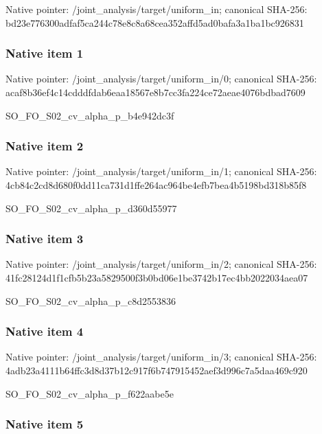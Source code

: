 \documentclass[10pt,a4paper]{article}
\begin{document}
Native pointer: /joint\_analysis/target/uniform\_in; canonical SHA-256: bd23e776300adfaf5ca244c7\allowbreak{}8e8c8a68cea352affd5ad0ba\allowbreak{}fa3a1ba1bc926831



\subsubsection{Native item 1}


Native pointer: /joint\_analysis/target/uniform\_in/0; canonical SHA-256: acaf8b36ef4c14cdddfdab6e\allowbreak{}aa18567e8b7cc3fa224ce72a\allowbreak{}eae4076bdbad7609


SO\_FO\_S02\_cv\_alpha\_p\_b4e942dc3f


\subsubsection{Native item 2}


Native pointer: /joint\_analysis/target/uniform\_in/1; canonical SHA-256: 4cb84c2cd8d680f0dd11ca73\allowbreak{}1d1ffe264ac964be4efb7bea\allowbreak{}4b5198bd318b85f8


SO\_FO\_S02\_cv\_alpha\_p\_d360d55977


\subsubsection{Native item 3}


Native pointer: /joint\_analysis/target/uniform\_in/2; canonical SHA-256: 41fc28124d1f1cfb5b23a582\allowbreak{}9500f3b0bd06e1be3742b17e\allowbreak{}c4bb2022034aea07


SO\_FO\_S02\_cv\_alpha\_p\_c8d2553836


\subsubsection{Native item 4}


Native pointer: /joint\_analysis/target/uniform\_in/3; canonical SHA-256: 4adb23a4111b64ffc3d8d37b\allowbreak{}12c917f6b747915452aef3d9\allowbreak{}96c7a5daa469c920


SO\_FO\_S02\_cv\_alpha\_p\_f622aabe5e


\subsubsection{Native item 5}
\end{document}
